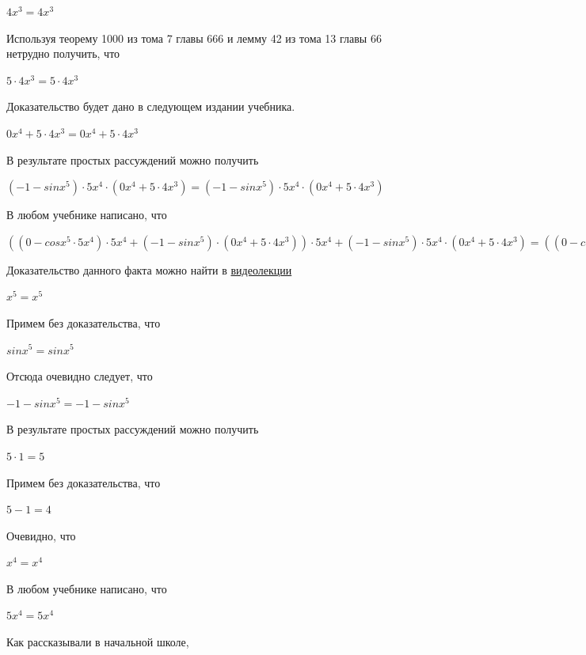 \documentclass[12pt,a4paper,fleqn]{article}
\theoremstyle{definition}
\begin{document}
$ 4 { x }^{ 3 } =  4 { x }^{ 3 }$

Используя теорему 1000 из тома 7 главы 666 и лемму 42 из тома 13 главы 66 нетрудно получить, что 

$ 5  \cdot  4 { x }^{ 3 } =  5  \cdot  4 { x }^{ 3 }$

Доказательство будет дано в следующем издании учебника. 

$ 0 { x }^{ 4 } +  5  \cdot  4 { x }^{ 3 } =  0 { x }^{ 4 } +  5  \cdot  4 { x }^{ 3 }$

В результате простых рассуждений можно получить 

$( -1  - sin{ x }^{ 5 }) \cdot  5 { x }^{ 4 } \cdot ( 0 { x }^{ 4 } +  5  \cdot  4 { x }^{ 3 }) = ( -1  - sin{ x }^{ 5 }) \cdot  5 { x }^{ 4 } \cdot ( 0 { x }^{ 4 } +  5  \cdot  4 { x }^{ 3 })$

В любом учебнике написано, что 

$(( 0  - cos{ x }^{ 5 } \cdot  5 { x }^{ 4 }) \cdot  5 { x }^{ 4 } + ( -1  - sin{ x }^{ 5 }) \cdot ( 0 { x }^{ 4 } +  5  \cdot  4 { x }^{ 3 })) \cdot  5 { x }^{ 4 } + ( -1  - sin{ x }^{ 5 }) \cdot  5 { x }^{ 4 } \cdot ( 0 { x }^{ 4 } +  5  \cdot  4 { x }^{ 3 }) = (( 0  - cos{ x }^{ 5 } \cdot  5 { x }^{ 4 }) \cdot  5 { x }^{ 4 } + ( -1  - sin{ x }^{ 5 }) \cdot ( 0 { x }^{ 4 } +  5  \cdot  4 { x }^{ 3 })) \cdot  5 { x }^{ 4 } + ( -1  - sin{ x }^{ 5 }) \cdot  5 { x }^{ 4 } \cdot ( 0 { x }^{ 4 } +  5  \cdot  4 { x }^{ 3 })$

Доказательство данного факта можно найти в \href{https://www.youtube.com/watch?v=dQw4w9WgXcQ}{видеолекции} 

${ x }^{ 5 } = { x }^{ 5 }$

Примем без доказательства, что 

$sin{ x }^{ 5 } = sin{ x }^{ 5 }$

Отсюда очевидно следует, что 

$ -1  - sin{ x }^{ 5 } =  -1  - sin{ x }^{ 5 }$

В результате простых рассуждений можно получить 

$ 5  \cdot  1  =  5 $

Примем без доказательства, что 

$ 5  -  1  =  4 $

Очевидно, что 

${ x }^{ 4 } = { x }^{ 4 }$

В любом учебнике написано, что 

$ 5 { x }^{ 4 } =  5 { x }^{ 4 }$

Как рассказывали в начальной школе, 
\end{document}
